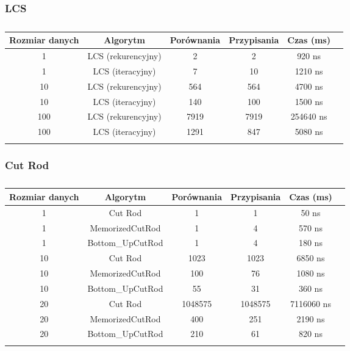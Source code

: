 \documentclass[a4paper,12pt]{article}
\begin{document}
\subsubsection{LCS}
\begin{longtable}{|c|c|c|c|c|c|}
\hline
Rozmiar danych & Algorytm & Porównania & Przypisania & Czas (ms) \\
\hline
1 & LCS (rekurencyjny) & 2 & 2 & 920 ns \\
1 & LCS (iteracyjny) & 7 & 10 & 1210 ns \\
\hline
10 & LCS (rekurencyjny) & 564 & 564 & 4700 ns \\
10 & LCS (iteracyjny) & 140 & 100 & 1500 ns \\
\hline
100 & LCS (rekurencyjny) & 7919 & 7919 & 254640 ns \\
100 & LCS (iteracyjny) & 1291 & 847 & 5080 ns \\
\hline
\caption{}
\label{tab:results}
\end{longtable}

\subsubsection{Cut Rod}
\begin{longtable}{|c|c|c|c|c|c|}
\hline
Rozmiar danych & Algorytm & Porównania & Przypisania & Czas (ms) \\
\hline
1 & Cut Rod & 1 & 1 & 50 ns \\
1 & MemorizedCutRod & 1 & 4 & 570 ns \\
1 & Bottom_UpCutRod & 1 & 4 & 180 ns \\
\hline
10 & Cut Rod & 1023 & 1023 & 6850 ns \\
10 & MemorizedCutRod & 100 & 76 & 1080 ns \\
10 & Bottom_UpCutRod & 55 & 31 & 360 ns \\
\hline
20 & Cut Rod & 1048575 & 1048575 & 7116060 ns \\
20 & MemorizedCutRod & 400 & 251 & 2190 ns \\
20 & Bottom_UpCutRod & 210 & 61 & 820 ns \\
\hline
\caption{}
\label{tab:results}
\end{longtable}

\newpage
\end{document}
